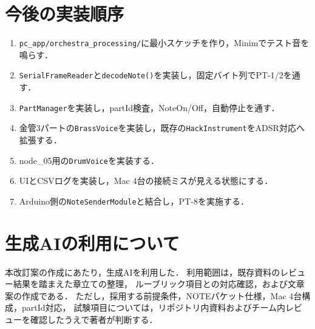 \documentclass[a4paper,11pt]{jsarticle}
\begin{document}
\section{今後の実装順序}

\begin{enumerate}
\item \texttt{pc\_app/orchestra\_processing/}に最小スケッチを作り，Minimでテスト音を鳴らす．
\item \texttt{SerialFrameReader}と\texttt{decodeNote()}を実装し，固定バイト列でPT-1/2を通す．
\item \texttt{PartManager}を実装し，partId検査，NoteOn/Off，自動停止を通す．
\item 金管3パートの\texttt{BrassVoice}を実装し，既存の\texttt{HackInstrument}をADSR対応へ拡張する．
\item node\_05用の\texttt{DrumVoice}を実装する．
\item UIとCSVログを実装し，Mac 4台の接続ミスが見える状態にする．
\item Arduino側の\texttt{NoteSenderModule}と結合し，PT-8を実施する．
\end{enumerate}

\section{生成AIの利用について}

本改訂案の作成にあたり，生成AIを利用した．
利用範囲は，既存資料のレビュー結果を踏まえた章立ての整理，
ルーブリック項目との対応確認，および文章案の作成である．
ただし，採用する前提条件，NOTEパケット仕様，Mac 4台構成，partId対応，
試験項目については，リポジトリ内資料およびチーム内レビューを確認したうえで著者が判断する．
\end{document}
